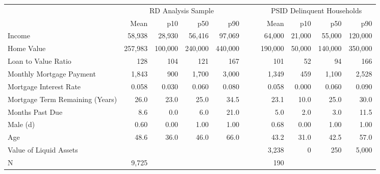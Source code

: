 \begin{tabular}{lrrrrllrrrr}
  \toprule
 \midrule
  & \multicolumn{4}{c}{RD Analysis Sample} & & &\multicolumn{4}{c}{PSID Delinquent Households}\\& Mean & p10 & p50 & p90 &&  & Mean & p10 & p50 & p90\\ \midrule
Income & 58,938 & 28,930 & 56,416 & 97,069 &  &  & 64,000 & 21,000 & 55,000 & 120,000 \\ 
  Home Value & 257,983 & 100,000 & 240,000 & 440,000 &  &  & 190,000 & 50,000 & 140,000 & 350,000 \\ 
  Loan to Value Ratio & 128 & 104 & 121 & 167 &  &  & 101 & 52 & 94 & 166 \\ 
  Monthly Mortgage Payment & 1,843 & 900 & 1,700 & 3,000 &  &  & 1,349 & 459 & 1,100 & 2,528 \\ 
  Mortgage Interest Rate & 0.058 & 0.030 & 0.060 & 0.080 &  &  & 0.058 & 0.000 & 0.060 & 0.090 \\ 
  Mortgage Term Remaining (Years) & 26.0 & 23.0 & 25.0 & 34.5 &  &  & 23.1 & 10.0 & 25.0 & 30.0 \\ 
  Months Past Due & 8.6 & 0.0 & 6.0 & 21.0 &  &  & 5.0 & 2.0 & 3.0 & 11.5 \\ 
  Male (d) & 0.60 & 0.00 & 1.00 & 1.00 &  &  & 0.68 & 0.00 & 1.00 & 1.00 \\ 
  Age & 48.6 & 36.0 & 46.0 & 66.0 &  &  & 43.2 & 31.0 & 42.5 & 57.0 \\ 
  Value of Liquid Assets &  &  &  &  &  &  & 3,238 & 0 & 250 & 5,000 \\ 
   \midrule
N & 9,725 &  &  &  &  &  & 190 &  &  &  \\ 
   \midrule
 \bottomrule
\end{tabular}

